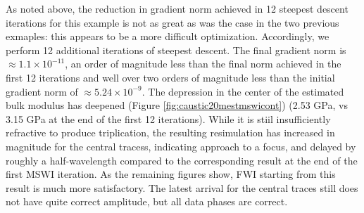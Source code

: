 
As noted above, the reduction in gradient norm achieved in 12 steepest
descent iterations for this example is not as great as was the case in
the two previous exmaples: this appears to be a more difficult
optimization. Accordingly, we perform 12 additional iterations of
steepest descent. The final gradient norm is $\approx 1.1 \times
10^{-11}$, an order of magnitude less than the final norm achieved in
the first 12 iterations and well over two orders of magnitude less
than the initial gradient norm of $\approx 5.24 \times 10^{-9}$. The
depression in the center of the estimated bulk modulus has deepened
(Figure \ref{fig:caustic20mestmswicont}) (2.53 GPa, vs 3.15 GPa at the
end of the first 12 iterations). While it is stiil insufficiently
refractive to produce triplication, the resulting resimulation has
increased in magnitude for the central tracess, indicating approach to a focus, and delayed by
roughly a half-wavelength compared to the corresponding result at the
end of the first MSWI iteration. As the remaining figures show, FWI
starting from this result is much more satisfactory. The latest
arrival for the central traces still does not have quite correct
amplitude, but all data phases are correct.








